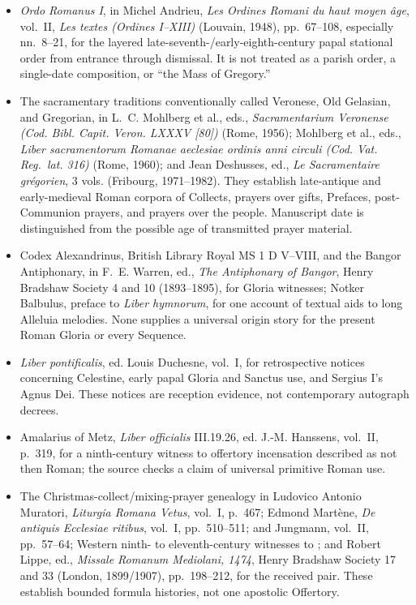 \begin{itemize}[nosep]
  \item \emph{Ordo Romanus I}, in Michel Andrieu, \emph{Les Ordines Romani du haut moyen âge}, vol.~II, \emph{Les textes (Ordines I--XIII)} (Louvain, 1948), pp.~67--108, especially nn.~8--21, for the layered late-seventh-/early-eighth-century papal stational order from entrance through dismissal. It is not treated as a parish order, a single-date composition, or ``the Mass of Gregory.''
  \item The sacramentary traditions conventionally called Veronese, Old Gelasian, and Gregorian, in L.~C. Mohlberg et al., eds., \emph{Sacramentarium Veronense (Cod. Bibl. Capit. Veron. LXXXV [80])} (Rome, 1956); Mohlberg et al., eds., \emph{Liber sacramentorum Romanae aeclesiae ordinis anni circuli (Cod. Vat. Reg.~lat. 316)} (Rome, 1960); and Jean Deshusses, ed., \emph{Le Sacramentaire grégorien}, 3 vols. (Fribourg, 1971--1982). They establish late-antique and early-medieval Roman corpora of Collects, prayers over gifts, Prefaces, post-Communion prayers, and prayers over the people. Manuscript date is distinguished from the possible age of transmitted prayer material.
  \item Codex Alexandrinus, British Library Royal MS 1 D V--VIII, and the Bangor Antiphonary, in F.~E. Warren, ed., \emph{The Antiphonary of Bangor}, Henry Bradshaw Society 4 and 10 (1893--1895), for Gloria witnesses; Notker Balbulus, preface to \emph{Liber hymnorum}, for one account of textual aids to long Alleluia melodies. None supplies a universal origin story for the present Roman Gloria or every Sequence.
  \item \emph{Liber pontificalis}, ed. Louis Duchesne, vol.~I, for retrospective notices concerning Celestine, early papal Gloria and Sanctus use, and Sergius I's Agnus Dei. These notices are reception evidence, not contemporary autograph decrees.
  \item Amalarius of Metz, \emph{Liber officialis} III.19.26, ed. J.-M. Hanssens, vol.~II, p.~319, for a ninth-century witness to offertory incensation described as not then Roman; the source checks a claim of universal primitive Roman use.
  \item The Christmas-collect/mixing-prayer genealogy in Ludovico Antonio Muratori, \emph{Liturgia Romana Vetus}, vol.~I, p.~467; Edmond Martène, \emph{De antiquis Ecclesiae ritibus}, vol.~I, pp.~510--511; and Jungmann, vol.~II, pp.~57--64; Western ninth- to eleventh-century witnesses to ; and Robert Lippe, ed., \emph{Missale Romanum Mediolani, 1474}, Henry Bradshaw Society 17 and 33 (London, 1899/1907), pp.~198--212, for the received  pair. These establish bounded formula histories, not one apostolic Offertory.

\end{itemize}
